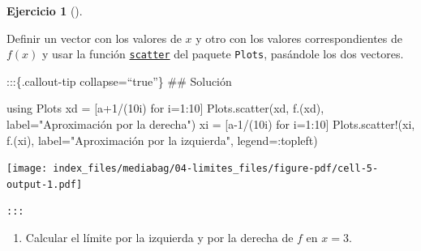 \documentclass[
  a4paper,
]{scrreport}
\newenvironment{Shaded}{\begin{snugshade}}{\end{snugshade}}
\newcommand{\BuiltInTok}[1]{\textcolor[rgb]{0.00,0.23,0.31}{#1}}
\newcommand{\FloatTok}[1]{\textcolor[rgb]{0.68,0.00,0.00}{#1}}
\newcommand{\FunctionTok}[1]{\textcolor[rgb]{0.28,0.35,0.67}{#1}}
\newcommand{\ImportTok}[1]{\textcolor[rgb]{0.00,0.46,0.62}{#1}}
\newcommand{\NormalTok}[1]{\textcolor[rgb]{0.00,0.23,0.31}{#1}}
\newcommand{\OperatorTok}[1]{\textcolor[rgb]{0.37,0.37,0.37}{#1}}
\newcommand{\StringTok}[1]{\textcolor[rgb]{0.13,0.47,0.30}{#1}}
\theoremstyle{definition}
\newtheorem{exercise}{Ejercicio}[chapter]
\theoremstyle{remark}
\begin{document}
\begin{exercise}[]
\begin{enumerate}
\begin{tcolorbox}
  Definir un vector con los valores de \(x\) y otro con los valores
  correspondientes de \(f(x)\) y usar la función
  \href{https://docs.juliaplots.org/latest/api/\#Plots.scatter-Tuple}{\texttt{scatter}}
  del paquete \texttt{Plots}, pasándole los dos vectores.

  \end{tcolorbox}

  :::\{.callout-tip collapse=``true''\} \#\# Solución
\end{enumerate}

\begin{Shaded}
\begin{Highlighting}[]
\ImportTok{using} \BuiltInTok{Plots}
\NormalTok{xd }\OperatorTok{=}\NormalTok{ [a}\OperatorTok{+}\FloatTok{1}\OperatorTok{/}\NormalTok{(}\FloatTok{10}\NormalTok{i) for i}\OperatorTok{=}\FloatTok{1}\OperatorTok{:}\FloatTok{10}\NormalTok{]}
\NormalTok{Plots.}\FunctionTok{scatter}\NormalTok{(xd, }\FunctionTok{f}\NormalTok{.(xd), label}\OperatorTok{=}\StringTok{"Aproximación por la derecha"}\NormalTok{)}
\NormalTok{xi }\OperatorTok{=}\NormalTok{ [a}\OperatorTok{{-}}\FloatTok{1}\OperatorTok{/}\NormalTok{(}\FloatTok{10}\NormalTok{i) for i}\OperatorTok{=}\FloatTok{1}\OperatorTok{:}\FloatTok{10}\NormalTok{]}
\NormalTok{Plots.}\FunctionTok{scatter!}\NormalTok{(xi, }\FunctionTok{f}\NormalTok{.(xi), label}\OperatorTok{=}\StringTok{"Aproximación por la izquierda"}\NormalTok{, legend}\OperatorTok{=:}\NormalTok{topleft)}
\end{Highlighting}
\end{Shaded}

\texttt{[image: index\_files/mediabag/04-limites\_files/figure-pdf/cell-5-output-1.pdf]}

\begin{verbatim}
:::
\end{verbatim}

\begin{enumerate}
\def\labelenumi{\alph{enumi}.}
\item
  Calcular el límite por la izquierda y por la derecha de \(f\) en
  \(x=3\).

  \begin{tcolorbox}[enhanced jigsaw, left=2mm, toprule=.15mm, toptitle=1mm, colback=white, opacitybacktitle=0.6, arc=.35mm, leftrule=.75mm, colbacktitle=quarto-callout-note-color!10!white, titlerule=0mm, title=\textcolor{quarto-callout-note-color}{\faInfo}\hspace{0.5em}{Ayuda}, bottomrule=.15mm, rightrule=.15mm, breakable, colframe=quarto-callout-note-color-frame, coltitle=black, bottomtitle=1mm, opacityback=0]


\end{tcolorbox}
\end{enumerate}
\end{exercise}
\end{document}
